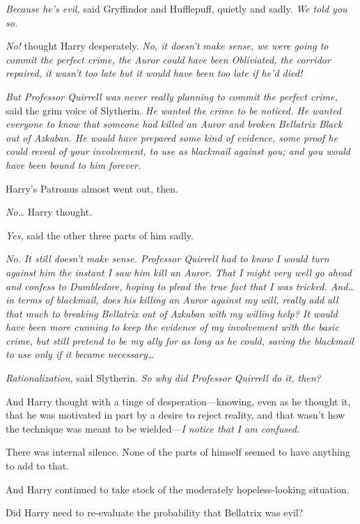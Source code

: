\emph{Because he's evil,} said Gryffindor and Hufflepuff, quietly and sadly. \emph{We told you so.}

\emph{No!} thought Harry desperately. \emph{No, it doesn't make sense, we were going to commit the perfect crime, the Auror could have been Obliviated, the corridor repaired, it wasn't too late but it \emph{would} have been too late if he'd died!}

\emph{But Professor Quirrell was never really planning to commit the perfect crime,} said the grim voice of Slytherin. \emph{He \emph{wanted} the crime to be noticed. He wanted everyone to know that someone had killed an Auror and broken Bellatrix Black out of Azkaban. He would have prepared some kind of evidence, some proof he could reveal of your involvement, to use as blackmail against you; and you would have been bound to him forever.}

Harry's Patronus almost went out, then.

\emph{No{\ldots}} Harry thought.

\emph{Yes,} said the other three parts of him sadly.

\emph{No. It still doesn't make sense. Professor Quirrell had to know I would turn against him the instant I saw him kill an Auror. That I might very well go ahead and confess to Dumbledore, hoping to plead the true fact that I was tricked. And{\ldots} in terms of blackmail, does his killing an Auror against my will, really add all \emph{that} much to breaking Bellatrix out of Azkaban with my willing help? It would have been more cunning to keep the evidence of my involvement with the basic crime, but still pretend to be my ally for as long as he could, saving the blackmail to use only if it became necessary{\ldots}}

\emph{Rationalization,} said Slytherin. \emph{So why \emph{did} Professor Quirrell do it, then?}

And Harry thought with a tinge of desperation—knowing, even as he thought it, that he was motivated in part by a desire to reject reality, and that wasn't how the technique was meant to be wielded—\emph{I notice that I am confused.}

There was internal silence. None of the parts of himself seemed to have anything to add to that.

And Harry continued to take stock of the moderately hopeless-looking situation.

Did Harry need to re-evaluate the probability that Bellatrix was evil?

